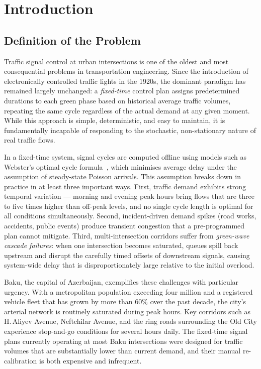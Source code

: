 \documentclass[12pt,oneside,a4paper]{report}
\begin{document}
\clearpage

\chapter{Introduction}
\label{chap:intro}

\section{Definition of the Problem}
\label{sec:def}

Traffic signal control at urban intersections is one of the oldest
and most consequential problems in transportation engineering.  Since
the introduction of electronically controlled traffic lights in the
1920s, the dominant paradigm has remained largely unchanged: a
\emph{fixed-time} control plan assigns predetermined durations to each
green phase based on historical average traffic volumes, repeating the
same cycle regardless of the actual demand at any given moment.  While
this approach is simple, deterministic, and easy to maintain, it is
fundamentally incapable of responding to the stochastic, non-stationary
nature of real traffic flows.

In a fixed-time system, signal cycles are computed offline using
models such as Webster's optimal cycle formula~\cite{lammerhelbing2008},
which minimises average delay under the assumption of steady-state
Poisson arrivals.  This assumption breaks down in practice in at least
three important ways.  First, traffic demand exhibits strong temporal
variation --- morning and evening peak hours bring flows that are three
to five times higher than off-peak levels, and no single cycle length
is optimal for all conditions simultaneously.  Second, incident-driven
demand spikes (road works, accidents, public events) produce transient
congestion that a pre-programmed plan cannot mitigate.  Third,
multi-intersection corridors suffer from \emph{green-wave cascade
failures}: when one intersection becomes saturated, queues spill back
upstream and disrupt the carefully timed offsets of downstream signals,
causing system-wide delay that is disproportionately large relative to
the initial overload.

Baku, the capital of Azerbaijan, exemplifies these challenges with
particular urgency.  With a metropolitan population exceeding four
million and a registered vehicle fleet that has grown by more than
$60\%$ over the past decade, the city's arterial network is routinely
saturated during peak hours.  Key corridors such as H.\,Aliyev Avenue,
Neftchilar Avenue, and the ring roads surrounding the Old City
experience stop-and-go conditions for several hours daily.  The
fixed-time signal plans currently operating at most Baku intersections
were designed for traffic volumes that are substantially lower than
current demand, and their manual re-calibration is both expensive
and infrequent.
\end{document}
